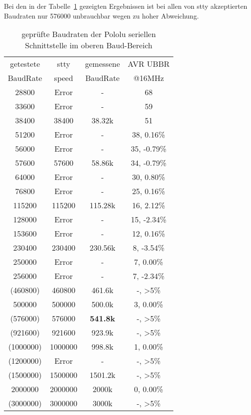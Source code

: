 Bei den in der Tabelle~\ref{tab:pololubaudh} gezeigten Ergebnissen ist bei allen
von stty akzeptierten Baudraten nur 576000 unbrauchbar wegen zu hoher Abweichung.

\begin{table}[H]
  \begin{center}
    \begin{tabular}{| c | c | c || c |}
    \hline
    getestete  & stty  & gemessene  & AVR UBBR  \\
    BaudRate   & speed & BaudRate  & @16MHz \\
    \hline
    \hline
    \hline
      28800  &  Error   &   -       &    68 \\
    \hline
      33600  &  Error   &   -       &    59  \\
    \hline
      38400  &  38400   &  38.32k  &    51  \\
    \hline
      51200  &  Error   &   -       &    38,  0.16\%  \\
    \hline
      56000  &  Error   &   -       &    35, -0.79\%  \\
    \hline
      57600  &  57600   &  58.86k    &    34, -0.79\%  \\
    \hline
      64000  &  Error   &   -       &    30,  0.80\%  \\
    \hline
      76800  &  Error   &   -       &    25, 0.16\%  \\
    \hline
     115200  &  115200  &  115.28k   &    16, 2.12\%  \\
    \hline
     128000  &  Error   &   -       &    15, -2.34\%  \\
    \hline
     153600  &  Error   &   -       &    12, 0.16\%  \\
    \hline
     230400  &  230400  &  230.56k   &    8, -3.54\%  \\
    \hline
     250000  &  Error   &   -       &    7, 0.00\%  \\
    \hline
     256000  &  Error   &   -       &    7, -2.34\%  \\
    \hline
    (460800) &  460800  & 461.6k &    -, >5\%  \\
    \hline
     500000  &  500000  &  500.0k   &    3, 0.00\%  \\
    \hline
    (576000)  & 576000 & \bf{541.8k}  &    -, >5\%  \\
    \hline
    (921600) &  921600  & 923.9k &    -, >5\%  \\
    \hline
   (1000000) & 1000000 &   998.8k    &    1, 0.00\%  \\
    \hline
   (1200000) &  Error   &   -        &   -, >5\%  \\
    \hline
   (1500000) & 1500000  & 1501.2k &   -, >5\%  \\
    \hline
    2000000  & 2000000 &   2000k   & 0, 0.00\%  \\
    \hline
   (3000000) & 3000000 &  3000k &   -, >5\%   \\
    \hline
    \end{tabular}
  \end{center}
  \caption{geprüfte Baudraten der Pololu seriellen Schnittstelle im oberen Baud-Bereich}
  \label{tab:pololubaudh}
\end{table}

